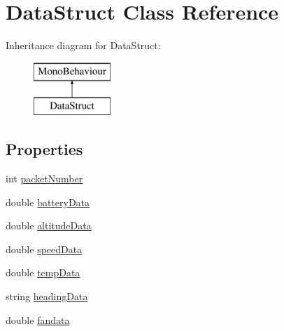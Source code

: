 \hypertarget{class_data_struct}{}\section{Data\+Struct Class Reference}
\label{class_data_struct}
Inheritance diagram for Data\+Struct\+:\begin{figure}[H]
\begin{center}
\leavevmode
\includegraphics[height=2.000000cm]{class_data_struct}
\end{center}
\end{figure}
\subsection*{Properties}
\begin{DoxyCompactItemize}
\item 
int \hyperlink{class_data_struct_a36ffc0cc31348653bd6787fa38d68ae1}{packet\+Number}
\item 
double \hyperlink{class_data_struct_a7952a7c54f7c360b52035b74d8e81593}{battery\+Data}
\item 
double \hyperlink{class_data_struct_ac7d27da7278e029f157996d9b8ecfdb3}{altitude\+Data}
\item 
double \hyperlink{class_data_struct_ac8525fcfa30d7a23e499c6bad5f8e581}{speed\+Data}
\item 
double \hyperlink{class_data_struct_a87fb43cc1ea238609c1d3b573ed9453d}{temp\+Data}
\item 
string \hyperlink{class_data_struct_a1bbceca73597381143e07c28b9b56adc}{heading\+Data}
\item 
double \hyperlink{class_data_struct_aaaa1f2333d3e066d6bc9d68e181ca999}{fandata}
\end{DoxyCompactItemize}


